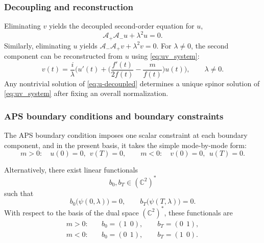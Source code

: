 \documentclass[11pt]{article}
\theoremstyle{definition}
\numberwithin{equation}{section}
\begin{document}
\subsubsection{Decoupling and reconstruction}\label{subsec:decouple-reconstruct}
Eliminating \(v\) yields the decoupled second-order equation for \(u\),
\begin{equation}\label{eq:u-decoupled}
\mathcal{A}_+\mathcal{A}_-u+\lambda^2 u=0.
\end{equation}
Similarly, eliminating \(u\) yields \(\mathcal{A}_-\mathcal{A}_+v+\lambda^2 v=0\). For \(\lambda\neq 0\), the second component can be
reconstructed from \(u\) using \eqref{eq:uv_system}:
\begin{equation}\label{eq:v-from-u}
v(t)=\frac{i}{\lambda}\Big(u'(t)+\Big(\frac{f'(t)}{2f(t)}-\frac{m}{f(t)}\Big)u(t)\Big),  \qquad \lambda \neq 0.
\end{equation}
Any nontrivial solution of \eqref{eq:u-decoupled} determines a unique spinor solution of
\eqref{eq:uv_system} after fixing an overall normalization.

\subsubsection{APS boundary conditions and boundary constraints}\label{subsec:aps-constraints}
The APS boundary condition imposes one
scalar constraint at each boundary component, and in the present basis, it takes the simple mode-by-mode form:
\begin{equation}
m>0:\quad u(0)=0,\ \ v(T)=0,
\qquad
m<0:\quad v(0)=0,\ \ u(T)=0.
\end{equation}

Alternatively, there exist linear functionals
\begin{equation}
b_0,b_T\in (\mathbb C^2)^\ast
\end{equation}
such that
\begin{equation}
b_0\bigl(\psi(0,\lambda)\bigr)=0,
\qquad
b_T\bigl(\psi(T,\lambda)\bigr)=0.
\end{equation}
With respect to the basis of the dual space \((\mathbb C^2)^\ast\), these functionals are
\begin{subequations}
\begin{align}
m>0:\quad & b_0=(1\ \ 0),\qquad b_T=(0\ \ 1), \\
m<0:\quad & b_0=(0\ \ 1),\qquad b_T=(1\ \ 0).
\end{align}
\end{subequations}
\end{document}
